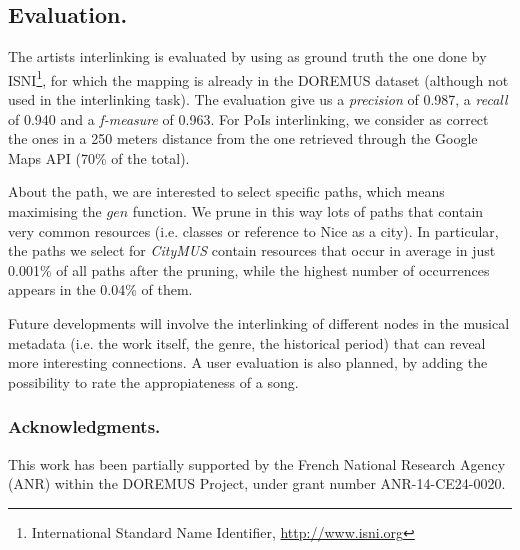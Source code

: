 \documentclass{llncs}
\begin{document}
\subsection*{Evaluation.}
The artists interlinking is evaluated by using as ground truth the one done by ISNI\footnote{International Standard Name Identifier, \url{http://www.isni.org}}, for which the mapping is already in the DOREMUS dataset (although not used in the interlinking task). The evaluation give us a \textit{precision} of 0.987, a \textit{recall} of 0.940 and a \textit{f-measure} of 0.963. For PoIs interlinking, we consider as correct the ones in a 250 meters distance from the one retrieved through the Google Maps API (70\% of the total).

About the path, we are interested to select specific paths, which means maximising the $gen$ function. We prune in this way lots of paths that contain very common resources (i.e. classes or reference to Nice as a city). In particular, the paths we select for \textit{CityMUS} contain resources that occur in average in just 0.001\% of all paths after the pruning, while the highest number of occurrences appears in the 0.04\% of them.

Future developments will involve the interlinking of different nodes in the musical metadata (i.e. the work itself, the genre, the historical period) that can reveal more interesting connections. A user evaluation is also planned, by adding the possibility to rate the appropiateness of a song.

\subsubsection*{Acknowledgments.}
This work has been partially supported by the French National Research Agency (ANR) within the DOREMUS Project, under grant number ANR-14-CE24-0020.




\newpage
\end{document}

